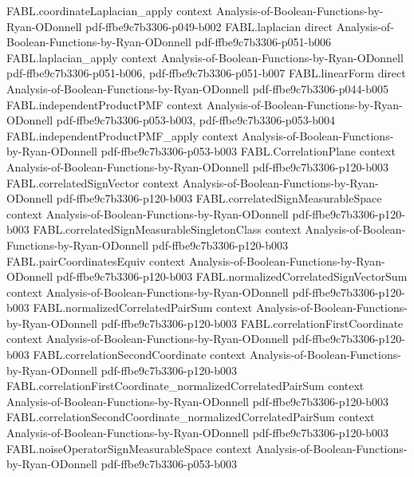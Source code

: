 \begin{theorem}
  {FABL.coordinateLaplacian_apply}
  {context}
  {Analysis-of-Boolean-Functions-by-Ryan-ODonnell}
  {pdf-ffbe9c7b3306-p049-b002}
\proofstep
  {FABL.laplacian}
  {direct}
  {Analysis-of-Boolean-Functions-by-Ryan-ODonnell}
  {pdf-ffbe9c7b3306-p051-b006}
\proofstep
  {FABL.laplacian_apply}
  {context}
  {Analysis-of-Boolean-Functions-by-Ryan-ODonnell}
  {pdf-ffbe9c7b3306-p051-b006,
    pdf-ffbe9c7b3306-p051-b007}
\proofstep
  {FABL.linearForm}
  {direct}
  {Analysis-of-Boolean-Functions-by-Ryan-ODonnell}
  {pdf-ffbe9c7b3306-p044-b005}
\proofstep
  {FABL.independentProductPMF}
  {context}
  {Analysis-of-Boolean-Functions-by-Ryan-ODonnell}
  {pdf-ffbe9c7b3306-p053-b003,
    pdf-ffbe9c7b3306-p053-b004}
\proofstep
  {FABL.independentProductPMF_apply}
  {context}
  {Analysis-of-Boolean-Functions-by-Ryan-ODonnell}
  {pdf-ffbe9c7b3306-p053-b003}
\proofstep
  {FABL.CorrelationPlane}
  {context}
  {Analysis-of-Boolean-Functions-by-Ryan-ODonnell}
  {pdf-ffbe9c7b3306-p120-b003}
\proofstep
  {FABL.correlatedSignVector}
  {context}
  {Analysis-of-Boolean-Functions-by-Ryan-ODonnell}
  {pdf-ffbe9c7b3306-p120-b003}
\proofstep
  {FABL.correlatedSignMeasurableSpace}
  {context}
  {Analysis-of-Boolean-Functions-by-Ryan-ODonnell}
  {pdf-ffbe9c7b3306-p120-b003}
\proofstep
  {FABL.correlatedSignMeasurableSingletonClass}
  {context}
  {Analysis-of-Boolean-Functions-by-Ryan-ODonnell}
  {pdf-ffbe9c7b3306-p120-b003}
\proofstep
  {FABL.pairCoordinatesEquiv}
  {context}
  {Analysis-of-Boolean-Functions-by-Ryan-ODonnell}
  {pdf-ffbe9c7b3306-p120-b003}
\proofstep
  {FABL.normalizedCorrelatedSignVectorSum}
  {context}
  {Analysis-of-Boolean-Functions-by-Ryan-ODonnell}
  {pdf-ffbe9c7b3306-p120-b003}
\proofstep
  {FABL.normalizedCorrelatedPairSum}
  {context}
  {Analysis-of-Boolean-Functions-by-Ryan-ODonnell}
  {pdf-ffbe9c7b3306-p120-b003}
\proofstep
  {FABL.correlationFirstCoordinate}
  {context}
  {Analysis-of-Boolean-Functions-by-Ryan-ODonnell}
  {pdf-ffbe9c7b3306-p120-b003}
\proofstep
  {FABL.correlationSecondCoordinate}
  {context}
  {Analysis-of-Boolean-Functions-by-Ryan-ODonnell}
  {pdf-ffbe9c7b3306-p120-b003}
\proofstep
  {FABL.correlationFirstCoordinate_normalizedCorrelatedPairSum}
  {context}
  {Analysis-of-Boolean-Functions-by-Ryan-ODonnell}
  {pdf-ffbe9c7b3306-p120-b003}
\proofstep
  {FABL.correlationSecondCoordinate_normalizedCorrelatedPairSum}
  {context}
  {Analysis-of-Boolean-Functions-by-Ryan-ODonnell}
  {pdf-ffbe9c7b3306-p120-b003}
\proofstep
  {FABL.noiseOperatorSignMeasurableSpace}
  {context}
  {Analysis-of-Boolean-Functions-by-Ryan-ODonnell}
  {pdf-ffbe9c7b3306-p053-b003}

\end{theorem}
